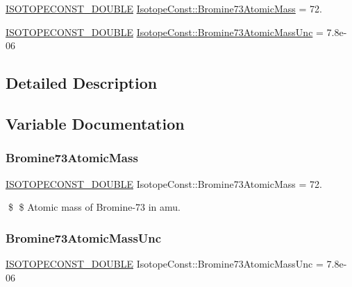 \begin{DoxyCompactItemize}
\item 
\mbox{\hyperlink{group___isotope_const-_macros_ga8f45a7272ce02c0b4c65c44636ed719a}{I\+S\+O\+T\+O\+P\+E\+C\+O\+N\+S\+T\+\_\+\+D\+O\+U\+B\+LE}} \mbox{\hyperlink{group___isotope_const-_bromine-_br73_gaef69bd160f2d2bc9bf08bf3486aaffeb}{Isotope\+Const\+::\+Bromine73\+Atomic\+Mass}} = 72.
\item 
\mbox{\hyperlink{group___isotope_const-_macros_ga8f45a7272ce02c0b4c65c44636ed719a}{I\+S\+O\+T\+O\+P\+E\+C\+O\+N\+S\+T\+\_\+\+D\+O\+U\+B\+LE}} \mbox{\hyperlink{group___isotope_const-_bromine-_br73_ga5445b5785dd3d1f294c2f9151d88a4ab}{Isotope\+Const\+::\+Bromine73\+Atomic\+Mass\+Unc}} = 7.\+8e-\/06
\end{DoxyCompactItemize}


\subsection{Detailed Description}


\subsection{Variable Documentation}
\mbox{\label{group___isotope_const-_bromine-_br73_gaef69bd160f2d2bc9bf08bf3486aaffeb}} 
\subsubsection{\texorpdfstring{Bromine73\+Atomic\+Mass}{Bromine73AtomicMass}}
{\footnotesize\ttfamily \mbox{\hyperlink{group___isotope_const-_macros_ga8f45a7272ce02c0b4c65c44636ed719a}{I\+S\+O\+T\+O\+P\+E\+C\+O\+N\+S\+T\+\_\+\+D\+O\+U\+B\+LE}} Isotope\+Const\+::\+Bromine73\+Atomic\+Mass = 72.}

\$ \$ Atomic mass of Bromine-\/73 in amu. \mbox{\label{group___isotope_const-_bromine-_br73_ga5445b5785dd3d1f294c2f9151d88a4ab}} 
\subsubsection{\texorpdfstring{Bromine73\+Atomic\+Mass\+Unc}{Bromine73AtomicMassUnc}}
{\footnotesize\ttfamily \mbox{\hyperlink{group___isotope_const-_macros_ga8f45a7272ce02c0b4c65c44636ed719a}{I\+S\+O\+T\+O\+P\+E\+C\+O\+N\+S\+T\+\_\+\+D\+O\+U\+B\+LE}} Isotope\+Const\+::\+Bromine73\+Atomic\+Mass\+Unc = 7.\+8e-\/06}

